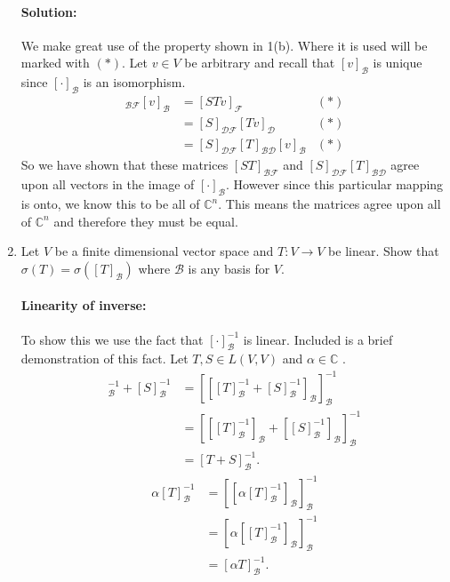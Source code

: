 \documentclass{article}
\begin{document}
\begin{enumerate}
      \paragraph{Solution: } 
      We make great use of the property shown in 1(b). Where it is used will be marked with $(*)$. Let $v\in V$ be arbitrary and recall that $[v]_{\mathcal{B}}$ is unique since $[\cdot ]_\mathcal{B}$ is an isomorphism. 
      \begin{align*}
          [ST]_{\mathcal{B}\mathcal{F}}[v]_\mathcal{B}&= [STv]_\mathcal{F}&(*) \\
                                              &= [S]_{\mathcal{D}\mathcal{F}}[Tv]_{\mathcal{D}}&(*) \\
                                              &= [S]_{\mathcal{D}\mathcal{F}}[T]_{\mathcal{B}\mathcal{D}}[v]_\mathcal{B}&(*) 
      \end{align*}
      So we have shown that these matrices $[ST]_{\mathcal{B}\mathcal{F}}$ and  $[S]_{\mathcal{DF}}[T]_{\mathcal{B}\mathcal{D}} $ agree upon all vectors in the image of $[\cdot ]_\mathcal{B}$. However since this particular mapping is onto, we know this to be all of  $\mathbb{C}^{n}$. This means the matrices agree upon all of $\mathbb{C}^{n}$ and therefore they must be equal. 
  \item Let $V$ be a finite dimensional vector space and $T : V \to V$ be linear. Show that $\sigma(T)=\sigma([T]_{\mathcal{B}})$ where $\mathcal{B}$ is any basis for $V$.
      \paragraph{Linearity of inverse:} To show this we use the fact that $[\cdot ]_\mathcal{B}^{-1}$ is linear. Included is a brief demonstration of this fact. 
      Let $T,S\in L(V,V)$ and $\alpha\in \mathbb{C}$ .
      \begin{align*}
          [T]_\mathcal{B}^{-1}+[S]_{\mathcal{B}}^{-1}&=
          [[[T]_\mathcal{B}^{-1}+[S]_{\mathcal{B}}^{-1}]_\mathcal{B}]_\mathcal{B}^{-1}\\
         &=[[[T]_\mathcal{B}^{-1}]_\mathcal{B}+[[S]_{\mathcal{B}}^{-1}]_\mathcal{B}]_\mathcal{B}^{-1}\\
         &=[T+S]_\mathcal{B}^{-1}
      .\end{align*}
      \begin{align*}
          \alpha[T]_\mathcal{B}^{-1}&= [[\alpha[T]_\mathcal{B}^{-1}]_\mathcal{B}]_\mathcal{B}^{-1} \\ 
                                    &= [\alpha[[T]_\mathcal{B}^{-1}]_\mathcal{B}]_\mathcal{B}^{-1} \\ 
                                    &= [\alpha T]_\mathcal{B}^{-1} 
      .\end{align*}

\end{enumerate}
\end{document}
